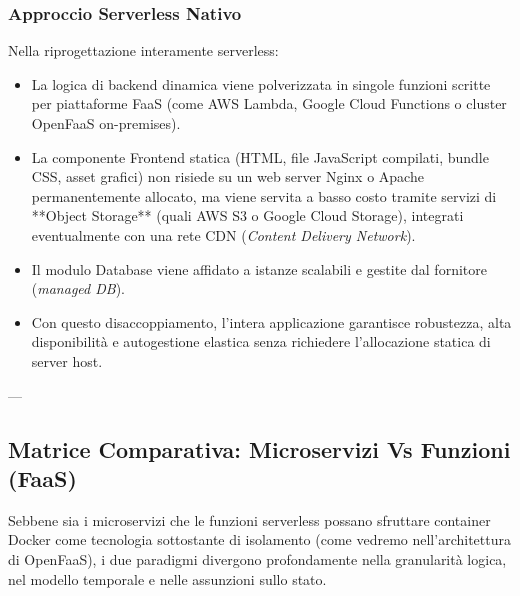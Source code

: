 \documentclass[11pt, a4paper]{article}
\begin{document}

\subsubsection{Approccio Serverless Nativo}
Nella riprogettazione interamente serverless:
\begin{itemize}[noitemsep]
    \item La logica di backend dinamica viene polverizzata in singole funzioni scritte per piattaforme FaaS (come AWS Lambda, Google Cloud Functions o cluster OpenFaaS on-premises).
    \item La componente Frontend statica (HTML, file JavaScript compilati, bundle CSS, asset grafici) non risiede su un web server Nginx o Apache permanentemente allocato, ma viene servita a basso costo tramite servizi di **Object Storage** (quali AWS S3 o Google Cloud Storage), integrati eventualmente con una rete CDN (\emph{Content Delivery Network}).
    \item Il modulo Database viene affidato a istanze scalabili e gestite dal fornitore (\emph{managed DB}).
    \item Con questo disaccoppiamento, l'intera applicazione garantisce robustezza, alta disponibilità e autogestione elastica senza richiedere l'allocazione statica di server host.
\end{itemize}

---

\subsection{Matrice Comparativa: Microservizi Vs Funzioni (FaaS)}

Sebbene sia i microservizi che le funzioni serverless possano sfruttare container Docker come tecnologia sottostante di isolamento (come vedremo nell'architettura di OpenFaaS), i due paradigmi divergono profondamente nella granularità logica, nel modello temporale e nelle assunzioni sullo stato.
\end{document}
